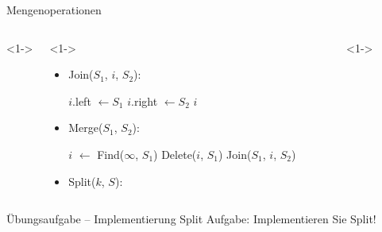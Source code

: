 \documentclass[t]{beamer}
\theoremstyle{plain}
\begin{document}
\begin{frame}{Mengenoperationen}
    \begin{columns}<1->
    \begin{column}{.65\textwidth}<1->
        \begin{itemize}
            \item<1> Join($S_1$, $i$, $S_2$):
                \begin{algorithm}[H]
                    $i$.left $\gets S_1$ \;
                    $i$.right $\gets S_2$ \;
                    \Return $i$
                \end{algorithm}
            \item<2> Merge($S_1$, $S_2$):
                \begin{algorithm}[H]
                    $i$ $\gets$ Find($\infty$, $S_1$) 
                    Delete($i$, $S_1$) \;
                    \Return Join($S_1$, $i$, $S_2$) \;
                \end{algorithm}
            \item<3> Split($k$, $S$):
                \begin{algorithm}[H]
                \end{algorithm}
        \end{itemize}
    \end{column}
    \begin{column}{.35\textwidth}<1->
    \end{column}
    \end{columns}
\end{frame}
\begin{frame}{Übungsaufgabe -- Implementierung Split}
    Aufgabe: Implementieren Sie Split!
\end{frame}
\end{document}
